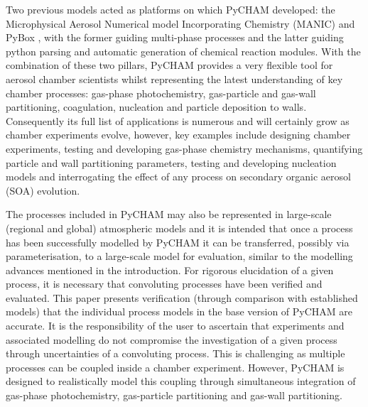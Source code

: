\documentclass[gmd, manuscript]{copernicus}
\begin{document}
Two previous models acted as platforms on which PyCHAM developed: the Microphysical Aerosol Numerical model Incorporating Chemistry (MANIC) \citep{Lowe2009} and PyBox \citep{Topping2018}, with the former guiding multi-phase processes and the latter guiding python parsing and automatic generation of chemical reaction modules.  With the combination of these two pillars, PyCHAM provides a very flexible tool for aerosol chamber scientists whilst representing the latest understanding of key chamber processes: gas-phase photochemistry, gas-particle and gas-wall partitioning, coagulation, nucleation and particle deposition to walls.  Consequently its full list of applications is numerous and will certainly grow as chamber experiments evolve, however, key examples include designing chamber experiments, testing and developing gas-phase chemistry mechanisms, quantifying particle and wall partitioning parameters, testing and developing nucleation models and interrogating the effect of any process on secondary organic aerosol (SOA) evolution.

The processes included in PyCHAM may also be represented in large-scale (regional and global) atmospheric models and it is intended that once a process has been successfully modelled by PyCHAM it can be transferred, possibly via parameterisation, to a large-scale model for evaluation, similar to the modelling advances mentioned in the introduction.  For rigorous elucidation of a given process, it is necessary that convoluting processes have been verified and evaluated.  This paper presents verification (through comparison with established models) that the individual process models in the base version of PyCHAM are accurate.  It is the responsibility of the user to ascertain that experiments and associated modelling do not compromise the investigation of a given process through uncertainties of a convoluting process.  This is challenging as multiple processes can be coupled inside a chamber experiment.  However, PyCHAM is designed to realistically model this coupling through simultaneous integration of gas-phase photochemistry, gas-particle partitioning and gas-wall partitioning.
\end{document}
